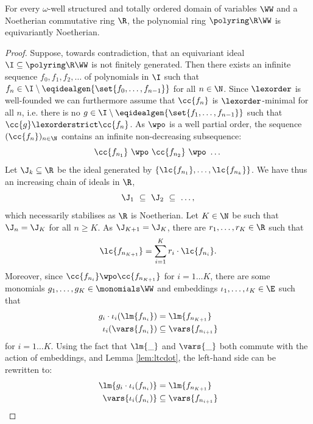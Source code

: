 \begin{theoremrep}\label{thm:equiv noeth}
For every $\omega$-well structured and totally ordered domain of variables $\WW$ and a
Noetherian commutative ring $\R$, the polynomial ring $\polyring \R \WW$ is equivariantly Noetherian.
\end{theoremrep}
%
\begin{proof}
Suppose, towards contradiction, that an equivariant ideal $\I\subseteq\polyring\R\WW$ is not
finitely generated.
Then there exists an infinite sequence $f_0,f_1,f_2,\dots$ of polynomials in $\I$ such that
$f_n \in \I\setminus\eqidealgen{\set{f_0,\dots,f_{n-1}}}$ for all $n\in\N$.
Since $\lexorder$ is well-founded we can furthermore assume that $\cc{f_{n}}$ is $\lexorder$-minimal for all $n$,
i.e. there is no $g\in\I\setminus\eqidealgen{\set{f_1,\dots,f_{n-1}}}$ such that $\cc{g}\lexorderstrict \cc{f_n}$.
As $\wpo$ is a well partial order, the sequence $(\cc {f_n})_{n\in\N}$ contains an infinite non-decreasing subsequence:
\[
\cc{f_{n_1}} \ \wpo \ \cc{f_{n_2}} \ \wpo \ \dots
\]
Let $\J_k \subseteq \R$ be the ideal generated by $\{\lc{f_{n_1}},\dots,\lc{f_{n_k}}\}$.
We have thus an increasing chain of ideals in $\R$,
\[
\J_1 \ \subseteq \ \J_2 \ \subseteq \ \dots,
\] 
which necessarily stabilises as $\R$ is Noetherian.
Let $K \in \N$ be such that $\J_n = \J_K$ for all $n \geq K$.
As $\J_{K+1} = \J_K$,
there are $r_1,\dots,r_K \in \R$  such that
%
\begin{align} \label{eq:lclc}
\lc{f_{n_{K+1}}} = \sum_{i = 1}^K r_i \cdot \lc{f_{n_i}}.
\end{align}
%
Moreover, since $\cc {f_{n_i}} \wpo \cc {f_{n_{K+1}}}$ for $i = 1 \ldots K$, there are some
monomials $g_1,\dots,g_K \in \monomials \WW$ and 
embeddings $\iota_1,\dots,\iota_K \in \E$ such that
%
\begin{align*}%
g_i \cdot \iota_i(\lm{f_{n_i}}) & = \lm{f_{n_{K+1}}} \\
\iota_i(\vars{f_{n_i}}) & \subseteq \vars{f_{n_{i+1}}} 
\end{align*}
%
for $i = 1 \ldots K$.
Using the fact that $\lm{\_}$ and $\vars{\_}$ both commute with the action of embeddings, 
and Lemma \ref{lem:ltcdot}, the left-hand side can be rewritten to:
%
\begin{align}\label{eq:vars and mon}
\lm{g_i \cdot \iota_i(f_{n_i})} & = \lm{f_{n_{K+1}}} \\
\label{eq:varsvars}
\vars{\iota_i(f_{n_i})} & \subseteq \vars{f_{n_{i+1}}} 
\end{align}

\end{proof}
